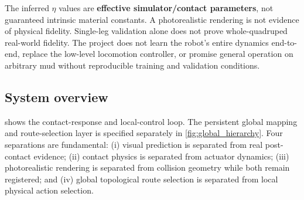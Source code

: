 \begin{warningbox}
The inferred $\eta$ values are \textbf{effective simulator/contact parameters}, not guaranteed intrinsic material constants. A photorealistic rendering is not evidence of physical fidelity. Single-leg validation alone does not prove whole-quadruped real-world fidelity. The project does not learn the robot's entire dynamics end-to-end, replace the low-level locomotion controller, or promise general operation on arbitrary mud without reproducible training and validation conditions.
\end{warningbox}

\subsection{System overview}

 shows the contact-response and local-control loop. The persistent global mapping and route-selection layer is specified separately in \cref{fig:global_hierarchy}. Four separations are fundamental: (i) visual prediction is separated from real post-contact evidence; (ii) contact physics is separated from actuator dynamics; (iii) photorealistic rendering is separated from collision geometry while both remain registered; and (iv) global topological route selection is separated from local physical action selection.

